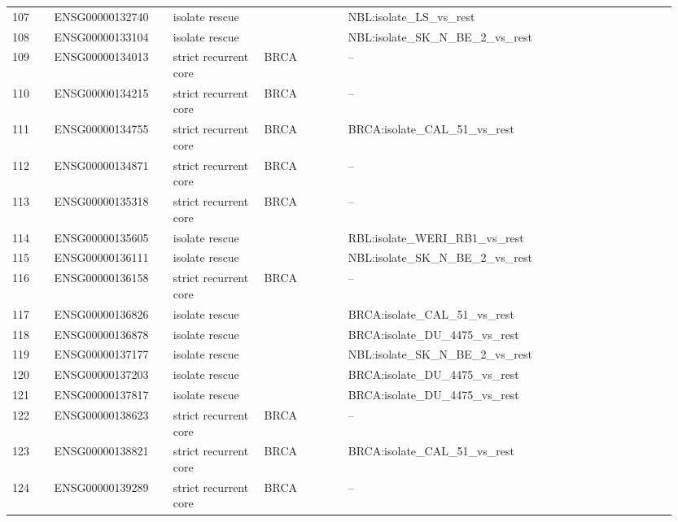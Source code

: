 \begin{landscape}
{\begin{longtable}{p{0.06\linewidth}p{0.17\linewidth}p{0.13\linewidth}p{0.12\linewidth}p{0.47\linewidth}}
107 & ENSG00000132740 & isolate rescue &  & NBL:isolate\_\allowbreak{}LS\_\allowbreak{}vs\_\allowbreak{}rest \\
108 & ENSG00000133104 & isolate rescue &  & NBL:isolate\_\allowbreak{}SK\_\allowbreak{}N\_\allowbreak{}BE\_\allowbreak{}2\_\allowbreak{}vs\_\allowbreak{}rest \\
109 & ENSG00000134013 & strict recurrent core & BRCA & -- \\
110 & ENSG00000134215 & strict recurrent core & BRCA & -- \\
111 & ENSG00000134755 & strict recurrent core & BRCA & BRCA:isolate\_\allowbreak{}CAL\_\allowbreak{}51\_\allowbreak{}vs\_\allowbreak{}rest \\
112 & ENSG00000134871 & strict recurrent core & BRCA & -- \\
113 & ENSG00000135318 & strict recurrent core & BRCA & -- \\
114 & ENSG00000135605 & isolate rescue &  & RBL:isolate\_\allowbreak{}WERI\_\allowbreak{}RB1\_\allowbreak{}vs\_\allowbreak{}rest \\
115 & ENSG00000136111 & isolate rescue &  & NBL:isolate\_\allowbreak{}SK\_\allowbreak{}N\_\allowbreak{}BE\_\allowbreak{}2\_\allowbreak{}vs\_\allowbreak{}rest \\
116 & ENSG00000136158 & strict recurrent core & BRCA & -- \\
117 & ENSG00000136826 & isolate rescue &  & BRCA:isolate\_\allowbreak{}CAL\_\allowbreak{}51\_\allowbreak{}vs\_\allowbreak{}rest \\
118 & ENSG00000136878 & isolate rescue &  & BRCA:isolate\_\allowbreak{}DU\_\allowbreak{}4475\_\allowbreak{}vs\_\allowbreak{}rest \\
119 & ENSG00000137177 & isolate rescue &  & NBL:isolate\_\allowbreak{}SK\_\allowbreak{}N\_\allowbreak{}BE\_\allowbreak{}2\_\allowbreak{}vs\_\allowbreak{}rest \\
120 & ENSG00000137203 & isolate rescue &  & BRCA:isolate\_\allowbreak{}DU\_\allowbreak{}4475\_\allowbreak{}vs\_\allowbreak{}rest \\
121 & ENSG00000137817 & isolate rescue &  & BRCA:isolate\_\allowbreak{}DU\_\allowbreak{}4475\_\allowbreak{}vs\_\allowbreak{}rest \\
122 & ENSG00000138623 & strict recurrent core & BRCA & -- \\
123 & ENSG00000138821 & strict recurrent core & BRCA & BRCA:isolate\_\allowbreak{}CAL\_\allowbreak{}51\_\allowbreak{}vs\_\allowbreak{}rest \\
124 & ENSG00000139289 & strict recurrent core & BRCA & -- \\

\end{longtable}}
\end{landscape}
